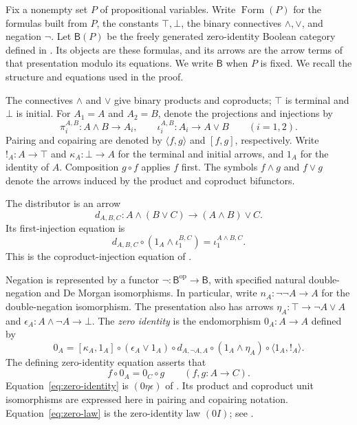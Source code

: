 \documentclass[11pt]{article}
\newcommand{\B}{\mathsf B}
\newcommand{\FormulaSet}{\operatorname{Form}}
\begin{document}
Fix a nonempty set $P$ of propositional variables. Write $\FormulaSet(P)$
for the formulas built from $P$, the constants $\top,\bot$, the binary
connectives $\wedge,\vee$, and negation $\neg$. Let $\B(P)$ be the
freely generated zero-identity Boolean category defined in
\cite[\S\S14.2--14.3]{DP}. Its objects are these formulas, and its
arrows are the arrow terms of that presentation modulo its equations.
We write $\B$ when $P$ is fixed. We recall the structure and equations
used in the proof.

The connectives $\wedge$ and $\vee$ give binary products and coproducts;
$\top$ is terminal and $\bot$ is initial. For $A_1=A$ and $A_2=B$,
denote the projections and injections by
\[
 \pi_i^{A,B}:A\wedge B\longrightarrow A_i,
 \qquad
 \iota_i^{A,B}:A_i\longrightarrow A\vee B
 \qquad(i=1,2).
\]
Pairing and copairing are denoted
by $\langle f,g\rangle$ and $[f,g]$, respectively. Write
$!_A:A\to\top$ and $\kappa_A:\bot\to A$ for the terminal and initial
arrows, and $1_A$ for the identity of $A$. Composition $g\circ f$
applies $f$ first. The symbols $f\wedge g$ and $f\vee g$ denote the
arrows induced by the product and coproduct bifunctors.

The distributor is an arrow
\[
 d_{A,B,C}:A\wedge(B\vee C)\longrightarrow(A\wedge B)\vee C.
\]
Its first-injection equation is
\begin{equation}
 d_{A,B,C}\circ(1_A\wedge\iota_1^{B,C})
   =\iota_1^{A\wedge B,C}.
 \label{eq:first-injection}
\end{equation}
This is the coproduct-injection equation of
\cite[\S11.1, p.~234]{DP}.

Negation is represented by a functor
$\neg:\B^{\mathrm{op}}\to\B$, with specified natural
double-negation and De Morgan isomorphisms. In particular, write
$n_A:\neg\neg A\to A$ for the double-negation isomorphism.
The presentation also has arrows
$\eta_A:\top\to\neg A\vee A$ and
$\epsilon_A:A\wedge\neg A\to\bot$.
The \emph{zero identity} is the endomorphism $0_A:A\to A$ defined by
\begin{equation}
 0_A=[\kappa_A,1_A]\circ(\epsilon_A\vee1_A)\circ d_{A,\neg A,A}
     \circ(1_A\wedge\eta_A)\circ\langle1_A,!_A\rangle.
 \label{eq:zero-identity}
\end{equation}
The defining zero-identity equation asserts that
\begin{equation}
 f\circ0_A=0_C\circ g
 \qquad(f,g:A\to C).
 \label{eq:zero-law}
\end{equation}
Equation~\eqref{eq:zero-identity} is $(0\eta\epsilon)$ of
\cite[\S14.2, p.~317]{DP}. Its product and coproduct unit isomorphisms
are expressed here in pairing and copairing notation.
Equation~\eqref{eq:zero-law} is the zero-identity law $(0I)$;
see \cite[\S14.3, p.~322]{DP}.
\end{document}
